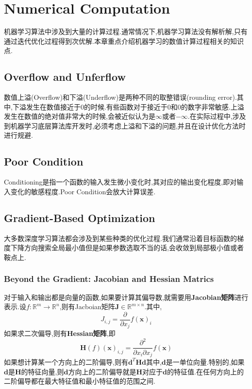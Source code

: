 \chapter{Numerical Computation}

机器学习算法中涉及到大量的计算过程.通常情况下,机器学习算法没有解析解,只有通过迭代优化过程得到次优解.本章重点介绍机器学习的数值计算过程相关的知识点.

\section{Overflow and Unferflow}
数值上溢(Overflow)和下溢(Underflow)是两种不同的取整错误(rounding error).其中,下溢发生在数值接近于$0$的时候.有些函数对于接近于$0$和$0$的数字非常敏感.上溢发生在数值的绝对值非常大的时候,会被近似认为是$\infty$或者$-\infty$.在实际过程中,涉及到机器学习底层算法库开发时,必须考虑上溢和下溢的问题,并且在设计优化方法时进行规避.

\section{Poor Condition}
Conditioning是指一个函数的输入发生微小变化时,其对应的输出变化程度,即对输入变化的敏感程度.Poor Condition会放大计算误差.

\section{Gradient-Based Optimization}
大多数深度学习算法都会涉及到某些种类的优化过程.我们通常沿着目标函数的梯度下降方向搜索全局最小值但是如果参数选取不当的话,会收敛到局部极小值或者鞍点上.

\subsection{Beyond the Gradient: Jacobian and Hessian Matrics}
对于输入和输出都是向量的函数,如果要计算其偏导数,就需要用\textbf{Jacobian矩阵}进行表示.设$f:\mathbb R^m\rightarrow\mathbb R^n$,则有Jacboian矩阵$\mathbf J\in\mathbb R^{m\times n}$.其中,
\begin{equation}\label{eq:jacobian_matrix}
J_{i,j}=\frac{\partial}{\partial x_j}f(\mathbf x)_i
\end{equation}
如果求二次偏导,则有\textbf{Hessian矩阵},即
\begin{equation}\label{eq:hessian_matrix}
\mathbf H(f)(\mathbf x)_{i,j}=\frac{\partial^2}{\partial x_i\partial x_j}f(\mathbf x)
\end{equation}
如果想计算某一个方向上的二阶偏导,则有$\mathbf{d}^T\mathbf{Hd}$其中,$\mathbf d$是一单位向量.特别的,如果$\mathbf d$是$\mathbf H$的特征向量,则$\mathbf d$方向上的二阶偏导就是$\mathbf H$对应于$\mathbf d$的特征值.在任何方向上的二阶偏导都在最大特征值和最小特征值的范围之间.

